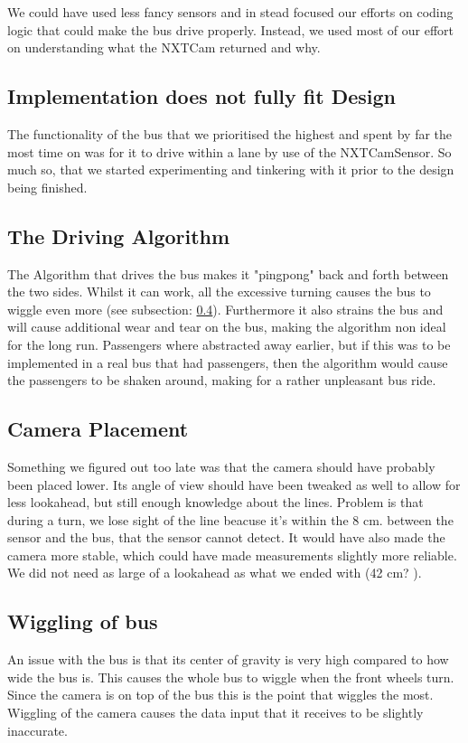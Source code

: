 We could have used less fancy sensors and in stead focused our efforts on coding logic that could make the bus drive properly. Instead, we used most of our effort on understanding what the NXTCam returned and why. 

\subsection{Implementation does not fully fit Design}
The functionality of the bus that we prioritised the highest and spent by far the most time on was for it to drive within a lane by use of the NXTCamSensor. So much so, that we started experimenting and tinkering with it prior to the design being finished. 

\subsection{The Driving Algorithm}\label{pingpong}
The Algorithm that drives the bus makes it "pingpong" back and forth between the two sides.
Whilst it can work, all the excessive turning causes the bus to wiggle even more (see subsection: \ref{wiggle}). Furthermore it also strains the bus and will cause additional wear and tear on the bus, making the algorithm non ideal for the long run. Passengers where abstracted away earlier, but if this was to be implemented in a real bus that had passengers, then the algorithm would cause the passengers to be shaken around, making for a rather unpleasant bus ride.

\subsection{Camera Placement}
Something we figured out too late was that the camera should have probably been placed lower. Its angle of view should have been tweaked as well to allow for less lookahead, but still enough knowledge about the lines. Problem is that during a turn, we lose sight of the line beacuse it's within the 8  cm. between the sensor and the bus, that the sensor cannot detect. It would have also made the camera more stable, which could have made measurements slightly more reliable. We did not need as large of a lookahead as what we ended with (42 cm? ). 

\subsection{Wiggling of bus}\label{wiggle}
An issue with the bus is that its center of gravity is very high compared to how wide the bus is. This causes the whole bus to wiggle when the front wheels turn. Since the camera is on top of the bus this is the point that wiggles the most. Wiggling of the camera causes the data input that it receives to be slightly inaccurate.

